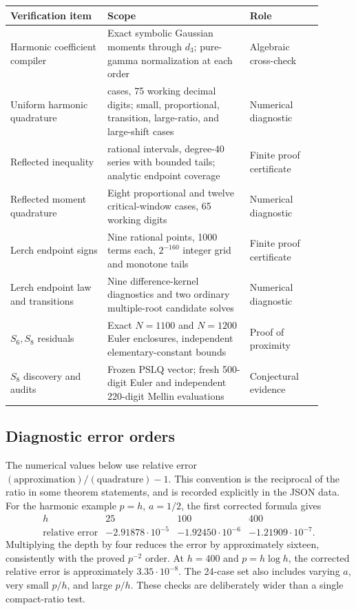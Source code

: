 \documentclass[11pt,letterpaper]{article}
\numberwithin{equation}{section}
\theoremstyle{plain}
\theoremstyle{definition}
\theoremstyle{remark}
\begin{document}
\begin{center}
\small
\begin{tabular}{>{\raggedright\arraybackslash}p{0.28\linewidth}>{\raggedright\arraybackslash}p{0.41\linewidth}>{\raggedright\arraybackslash}p{0.21\linewidth}}
\toprule
Verification item & Scope & Role\\
\midrule
Harmonic coefficient compiler &
Exact symbolic Gaussian moments through $d_3$; pure-gamma
normalization at each order &
Algebraic cross-check\\[0.35em]
Uniform harmonic quadrature &
24 cases, 75 working decimal digits; small, proportional,
transition, large-ratio, and large-shift cases &
Numerical diagnostic\\[0.35em]
Reflected inequality &
112 rational intervals, degree-40 series with bounded tails;
analytic endpoint coverage &
Finite proof certificate\\[0.35em]
Reflected moment quadrature &
Eight proportional and twelve critical-window cases,
65 working digits &
Numerical diagnostic\\[0.35em]
Lerch endpoint signs &
Nine rational points, 1000 terms each, $2^{-160}$ integer grid
and monotone tails &
Finite proof certificate\\[0.35em]
Lerch endpoint law and transitions &
Nine difference-kernel diagnostics and two ordinary
multiple-root candidate solves &
Numerical diagnostic\\[0.35em]
$S_6,S_8$ residuals &
Exact $N=1100$ and $N=1200$ Euler enclosures,
independent elementary-constant bounds &
Proof of proximity\\[0.35em]
$S_8$ discovery and audits &
Frozen PSLQ vector; fresh 500-digit Euler and independent
220-digit Mellin evaluations &
Conjectural evidence\\
\bottomrule
\end{tabular}
\end{center}

\subsection{Diagnostic error orders}

The numerical values below use relative error
$(\text{approximation})/(\text{quadrature})-1$. This convention is
the reciprocal of the ratio in some theorem statements, and is
recorded explicitly in the JSON data. For the harmonic example
$p=h$, $a=1/2$, the first corrected formula gives
\[
\begin{array}{c|ccc}
h&25&100&400\\ \hline
\text{relative error}
&-2.91878\cdot10^{-5}&-1.92450\cdot10^{-6}&-1.21909\cdot10^{-7}.
\end{array}
\]
Multiplying the depth by four reduces the error by approximately
sixteen, consistently with the proved $p^{-2}$ order.
At $h=400$ and $p=h\log h$, the corrected relative error is
approximately $3.35\cdot10^{-8}$.
The 24-case set also includes varying $a$, very small $p/h$, and
large $p/h$. These checks are deliberately wider than a single
compact-ratio test.
\end{document}
